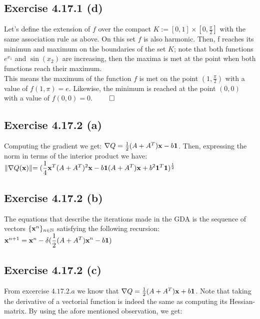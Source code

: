 \documentclass{exam}
\renewenvironment{proof}{{\noindent\itshape\ignorespaces}}{{\hfill$\qed$\\}}
\begin{document}
\subsection*{Exercise 4.17.1 (d)}
\begin{proof}
    Let's define the extension of $f$ over the compact $K := [0,1] \times [0, \frac{\pi}{2}]$ with the same association rule as above. On this set $f$ is also harmonic. Then, 
    f reaches its minimun and maximum  on the boundaries of the set $K$; note that both functions $e^{x_1}$ and $\sin(x_2)$ are increasing, then the maxima is met at the point when both functions
    reach their maximum. \\
    
    \noindent This means the maximum of the function $f$ is met on the point $(1,\frac{\pi}{2})$ with a value of $f(1,\pi) = e$. Likewise, the minimum is reached at the point $(0,0)$ with a value of $f(0,0) = 0$.
\end{proof}

\subsection*{Exercise 4.17.2 (a)}
Computing the gradient we get: $\nabla Q = \frac{1}{2}(A  + {A}^{T})\bold{x} - b\boldsymbol{1}$. Then, expressing the norm in terms of the interior product we have:\\
$\lVert \nabla Q(\bold{x}) \lVert = \displaystyle (\frac{1}{4}\bold{x}^{T}(A + {A}^{T})^{2}\bold{x} - b\boldsymbol{1}(A + {A}^{T})\bold{x} + b^{2}{\boldsymbol{1}}^{T}\boldsymbol{1})^{\frac{1}{2}}$

\subsection*{Exercise 4.17.2 (b)}
The equations that describe the iterations made in the GDA\footnotemark[1] is the sequence of vectors $\{\bold{x}^n\}_{n \in \mathbb{N}}$ satisfying the following 
recursion:
$\bold{x}^{n+1} = \bold{x}^{n} - \delta \displaystyle(\frac{1}{2}(A  + {A}^{T})\bold{x}^{n} - b\boldsymbol{1})$ 


\subsection*{Exercise 4.17.2 (c)}
From excercise $4.17.2.a$ we know that $\nabla Q = \frac{1}{2}(A  + {A}^{T})\bold{x} + b\boldsymbol{1}$. Note that taking the derivative of a vectorial 
function is indeed the same as computing its Hessian-matrix. By using the afore mentioned observation, we get:\\
\end{document}
